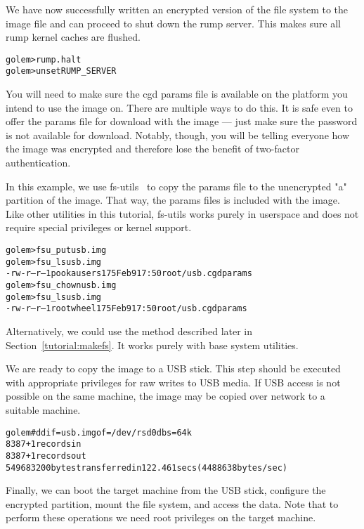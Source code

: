 We have now successfully written an encrypted version of the file system
to the image file and can proceed to shut down the rump server.  This
makes sure all rump kernel caches are flushed.

{\footnotesize
\begin{alltt}
golem> rump.halt
golem> unset RUMP_SERVER
\end{alltt}}

You will need to make sure the cgd params file is available on the
platform you intend to use the image on.  There are multiple ways
to do this.  It is safe even to offer the params file for download
with the image --- just make sure the password is not available
for download.  Notably, though, you will be telling everyone how
the image was encrypted and therefore lose the benefit of two-factor
authentication.

In this example, we use fs-utils~\cite{ysmal:fs-utils} to copy the
params file to the unencrypted "a" partition of the image.  That
way, the params files is included with the image.  Like other
utilities in this tutorial, fs-utils works purely in userspace and
does not require special privileges or kernel support.

{\footnotesize
\begin{alltt}
golem> fsu_put usb.img%DISKLABEL:a% usb.cgdparams root/
golem> fsu_ls usb.img%DISKLABEL:a% -l root/usb.cgdparams 
-rw-r--r--  1 pooka  users  175 Feb  9 17:50 root/usb.cgdparams
golem> fsu_chown usb.img%DISKLABEL:a% 0:0 root/usb.cgdparams
golem> fsu_ls usb.img%DISKLABEL:a% -l root/usb.cgdparams 
-rw-r--r--  1 root  wheel  175 Feb  9 17:50 root/usb.cgdparams
\end{alltt}}

Alternatively, we could use the method described later in
Section~\ref{tutorial:makefs}.  It works purely with base system
utilities.

We are ready to copy the image to a USB stick.  This step should
be executed with appropriate privileges for raw writes to USB media.
If USB access is not possible on the same machine, the image may be
copied over network to a suitable machine.

{\footnotesize
\begin{alltt}
golem# dd if=usb.img of=/dev/rsd0d bs=64k
8387+1 records in
8387+1 records out
549683200 bytes transferred in 122.461 secs (4488638 bytes/sec)
\end{alltt}}

Finally, we can boot the target machine from the USB stick, configure
the encrypted partition, mount the file system, and access the
data.  Note that to perform these operations we need root privileges
on the target machine.

